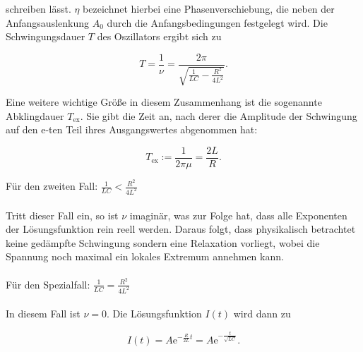 \documentclass[
  bibliography=totoc,     %
  captions=tableheading,  %
  titlepage=firstiscover, %
]{scrartcl}
\begin{document}
schreiben lässt. $\eta$ bezeichnet hierbei eine Phasenverschiebung, die neben
der Anfangsauslenkung $A_0$ durch die Anfangsbedingungen festgelegt wird. Die
Schwingungsdauer $T$ des Oszillators ergibt sich zu

\begin{equation}
    T=\frac{1}{\nu}=\frac{2\pi}{\sqrt{\frac{1}{LC}-\frac{R^2}{4L^2}}}.
    \label{schwingungsdauer}
\end{equation}

Eine weitere wichtige Größe in diesem Zusammenhang ist die sogenannte
Abklingdauer $T_{\mathup{ex}}$. Sie gibt die Zeit an, nach derer die Amplitude
der Schwingung auf den $\mathup{e}$-ten Teil ihres Ausgangswertes abgenommen hat:

\begin{equation}
    T_{\mathup{ex}}:=\frac{1}{2\pi\mu}=\frac{2L}{R}.
    \label{abklingdauer}
\end{equation}

Für den zweiten Fall: $\frac{1}{LC}<\frac{R^2}{4L^2}$ \\
\\
Tritt dieser Fall ein, so ist $\nu$ imaginär, was zur Folge hat, dass alle
Exponenten der Lösungsfunktion rein reell werden. Daraus folgt, dass
physikalisch betrachtet keine gedämpfte Schwingung sondern eine Relaxation
vorliegt, wobei die Spannung noch maximal ein lokales Extremum annehmen kann.\\
\\
Für den Spezialfall: $\frac{1}{LC}=\frac{R^2}{4L^2}$ \\
\\

In diesem Fall ist $\nu=0$. Die Lösungsfunktion $I(t)$ wird dann zu

\begin{equation}
    I(t)=A\mathup{e}^{-\frac{R}{2L}t}=A\mathup{e}^{-\frac{t}{\sqrt{LC}}}.
    \label{grenzfall}
\end{equation}
\end{document}
